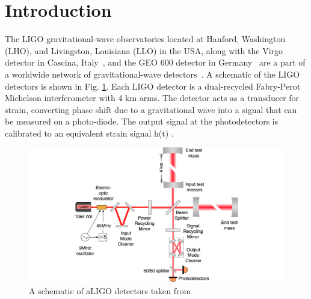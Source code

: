 \documentclass[12pt]{iopart}
\begin{document}
%
%



\section{Introduction}\label{introduction}

The LIGO  gravitational-wave observatories located at Hanford, Washington (LHO), and Livingston, Louisiana (LLO) in the USA, along with the Virgo detector in Cascina, Italy~\cite{Acernese_2014}, and the GEO 600 detector in Germany~\cite{Dooley_2016} are a part of a worldwide network of gravitational-wave detectors~\cite{2015}. 
A schematic of the LIGO detectors is shown in Fig. \ref{fig:schematic}.
Each LIGO detector is a dual-recycled Fabry-Perot Michelson interferometer with 4 km arms. The detector acts as a transducer for strain, converting phase shift due to a gravitational wave into a signal that can be measured on a photo-diode. The output signal at the photodetectors is calibrated to an equivalent strain signal h(t) \cite{Abbott_2017,Viets_2018}.

\begin{figure}[h]
    \centering
    \includegraphics[width=12cm]{ligo-schematic.png}
    \caption{A schematic of aLIGO detectors taken from {~\cite{Martynov_2016}} }
    \label{fig:schematic}
\end{figure}
\end{document}
